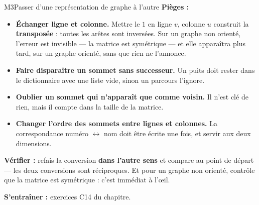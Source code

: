 \begin{fichemethode}{M3}{Passer d'une représentation de graphe à l'autre}
\textbf{Pièges :}
\begin{itemize}
  \item \textbf{Échanger ligne et colonne.} Mettre le $1$ en ligne $v$, colonne $u$ construit
    la \textbf{transposée} : toutes les arêtes sont inversées. Sur un graphe non orienté,
    l'erreur est invisible — la matrice est symétrique — et elle apparaîtra plus tard, sur un
    graphe orienté, sans que rien ne l'annonce.
  \item \textbf{Faire disparaître un sommet sans successeur.} Un puits doit rester dans le
    dictionnaire avec une liste vide, sinon un parcours l'ignore.
  \item \textbf{Oublier un sommet qui n'apparaît que comme voisin.} Il n'est clé de rien, mais
    il compte dans la taille de la matrice.
  \item \textbf{Changer l'ordre des sommets entre lignes et colonnes.} La correspondance
    numéro $\leftrightarrow$ nom doit être écrite une fois, et servir aux deux dimensions.
\end{itemize}

\textbf{Vérifier :} refais la conversion \textbf{dans l'autre sens} et compare au point de
départ — les deux conversions sont réciproques. Et pour un graphe non orienté, contrôle que la
matrice est symétrique : c'est immédiat à l'œil.

\textbf{S'entraîner :} exercices C14 du chapitre.
\end{fichemethode}
